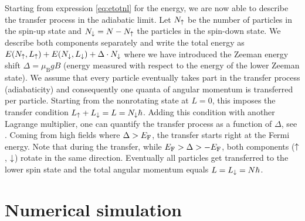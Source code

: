 Starting from expression \eqref{eq:etotnl} for the energy, we are now able to describe the transfer process in the adiabatic limit. Let $N_\uparrow$ be the number of particles in the spin-up state and $N_\downarrow = N-N_\uparrow$ the particles in the spin-down state. We describe both components separately and write the total energy as
$E(N_\uparrow,L_\uparrow) + E(N_\downarrow,L_\downarrow) + \Delta\cdot N_\downarrow$
where we have introduced the Zeeman energy shift $\Delta=\mu_\text{B} g B$ (energy measured with respect to the energy of the lower Zeeman state). We assume that every particle eventually takes part in the transfer process (adiabaticity) and consequently one quanta of angular momentum is transferred per particle. Starting from the nonrotating state at $L=0$, this imposes the transfer condition $L_\uparrow + L_\downarrow = L = N_\downarrow\hbar$. Adding this condition with another Lagrange multiplier, one can quantify the transfer process as a function of $\Delta$, see . Coming from high fields where $\Delta > E_\text{F}$, the transfer starts right at the Fermi energy. Note that during the transfer, while $E_\text{F} > \Delta > -E_\text{F}$, both components ($\uparrow$, $\downarrow$) rotate in the same direction. Eventually all particles get transferred to the lower spin state and the total angular momentum equals $L=L_\downarrow=N\hbar$.

\section{Numerical simulation}

